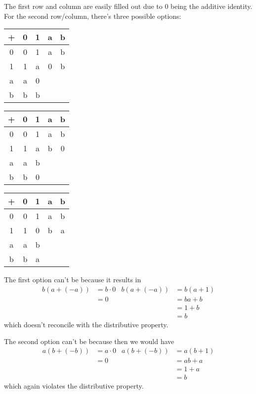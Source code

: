 \documentclass[12pt]{article}
\begin{document}
The first row and column are easily filled out due to $0$
being the additive identity.
For the second row/column, there's three possible options:
\begin{center}
      \hfill
      \begin{tabular}{ c|c|c|c|c }
            + & 0 & 1 & a & b \\ \hline
            0 & 0 & 1 & a & b \\ \hline
            1 & 1 & a & 0 & b \\ \hline
            a & a & 0 &   &   \\ \hline
            b & b & b &   &
      \end{tabular}
      \hfill
      \begin{tabular}{ c|c|c|c|c }
            + & 0 & 1 & a & b \\ \hline
            0 & 0 & 1 & a & b \\ \hline
            1 & 1 & a & b & 0 \\ \hline
            a & a & b &   &   \\ \hline
            b & b & 0 &   &
      \end{tabular}
      \hfill
      \begin{tabular}{ c|c|c|c|c }
            + & 0 & 1 & a & b \\ \hline
            0 & 0 & 1 & a & b \\ \hline
            1 & 1 & 0 & b & a \\ \hline
            a & a & b &   &   \\ \hline
            b & b & a &   &
      \end{tabular}
      \hfill \mbox{}  %
\end{center}
The first option can't be because it results in
\begin{align*}
      b(a+(-a)) & = b \cdot 0 & b(a+(-a)) & = b(a+1) \\
                & = 0         &           & = ba+b   \\
                &             &           & = 1+b    \\
                &             &           & = b
\end{align*}
which doesn't reconcile with the distributive property.

The second option can't be because then we would have
\begin{align*}
      a(b+(-b)) & = a \cdot 0 & a(b+(-b)) & = a(b+1) \\
                & = 0         &           & = ab+a   \\
                &             &           & = 1+a    \\
                &             &           & = b
\end{align*}
which again violates the distributive property.
\end{document}

